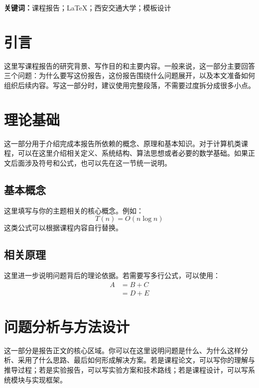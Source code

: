 \documentclass{xjtu-thesis}
\begin{document}
\makecover

\frontpages

\begin{abstract}
本文围绕课程主题展开分析与总结，介绍研究背景、核心问题、方法设计、过程分析与结果讨论，并在最后给出个人理解与课程收获。该模板注重结构清晰、页面简洁和信息层次分明，适合用于本科阶段课程报告、实验报告、课程论文与读书报告的写作。
\end{abstract}

\vspace{1em}
\noindent\textbf{关键词：}课程报告；LaTeX；西安交通大学；模板设计

\tableofcontents
\newpage

\mainpages

\section{引言}
这里写课程报告的研究背景、写作目的和主要内容。一般来说，这一部分主要回答三个问题：为什么要写这份报告，这份报告围绕什么问题展开，以及本文准备如何组织后续内容。写这一部分时，建议使用完整段落，不需要过度拆分成很多小点。

\section{理论基础}
这一部分用于介绍完成本报告所依赖的概念、原理和基本知识。对于计算机类课程，可以在这里介绍相关定义、系统结构、算法思想或者必要的数学基础。如果正文后面涉及符号和公式，也可以先在这一节统一说明。

\subsection{基本概念}
这里填写与你的主题相关的核心概念。例如：
\begin{equation}
T(n)=O(n\log n)
\end{equation}
这类公式可以根据课程内容自行替换。

\subsection{相关原理}
这里进一步说明问题背后的理论依据。若需要写多行公式，可以使用：
\begin{align}
A &= B + C \\
  &= D + E
\end{align}

\section{问题分析与方法设计}
这一部分是报告正文的核心区域。你可以在这里说明问题是什么、为什么这样分析、采用了什么思路、最后如何形成解决方案。若是课程论文，可以写你的理解与推导过程；若是实验报告，可以写实验方案和技术路线；若是课程设计，可以写系统模块与实现框架。
\end{document}

